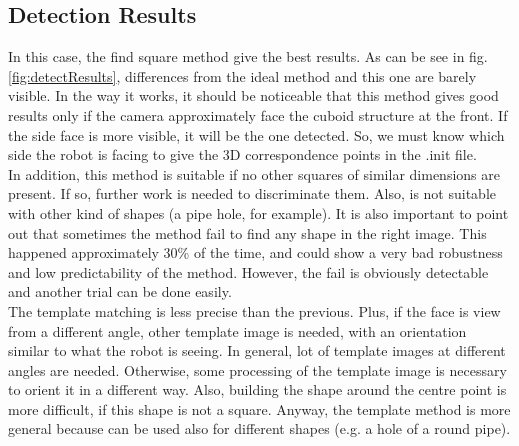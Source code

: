 \subsection{Detection Results}
\label{subsec:detectResult}
In this case, the find square method give the best results. As can be see in fig. \ref{fig:detectResults}, differences from the ideal method and this one are barely visible.
In the way it works, it should be noticeable that this method gives good results only if the camera approximately face the cuboid structure at the front. If the side face is more visible, it will be the one detected. So, we must know which side the robot is facing to give the 3D correspondence points in the .init file.\\
In addition, this method is suitable if no other squares of similar dimensions are present. If so, further work is needed to discriminate them. Also, is not suitable with other kind of shapes (a pipe hole, for example). It is also important to point out that sometimes the method fail to find any shape in the right image. This happened approximately 30\% of the time, and could show a very bad robustness and low predictability of the method. However, the fail is obviously detectable and another trial can be done easily.\\
The template matching is less precise than the previous. Plus, if the face is view from a different angle, other template image is needed, with an orientation similar to what the robot is seeing. In general, lot of template images at different angles are needed. Otherwise, some processing of the template image is necessary to orient it in a different way. Also, building the shape around the centre point is more difficult, if this shape is not a square. Anyway, the template method is more general because can be used also for different shapes (e.g. a hole of a round pipe).


